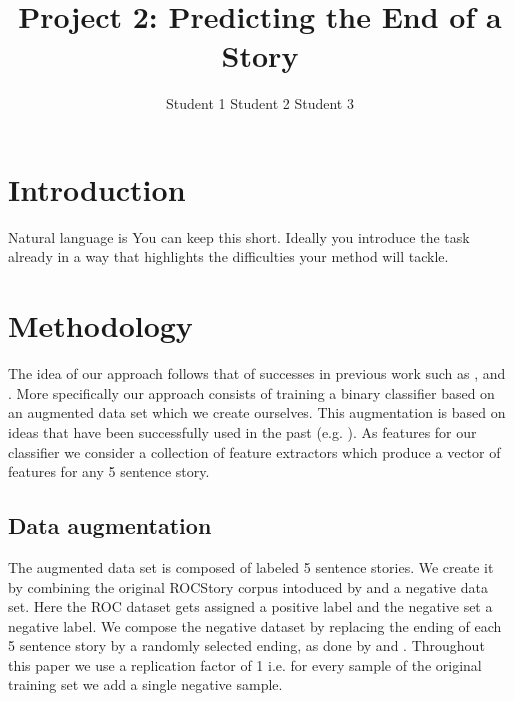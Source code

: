 \documentclass{article}
\title{Project 2: Predicting the End of a Story}
\author{Student 1 \qquad Student 2 \qquad Student 3}
\begin{document}

\maketitle



\section{Introduction}
\label{sec:intro}

Natural language is
You can keep this short. Ideally you introduce the task already in a way that highlights the difficulties  your method will tackle.

\section{Methodology}
\label{sec:general}
The idea of our approach follows that of successes in previous work such as \cite{UWNLP}, \cite{Goel} and \cite{COGCOMP}. More specifically our approach consists of training a binary classifier based on an augmented data set which we create ourselves. This augmentation is based on ideas that have been successfully used in the past (e.g. \cite{LSTMClassifier}\cite{SENTENCE_EMB}). As features for our classifier we consider a collection of feature extractors which produce a vector of features for any 5 sentence story.

\subsection{Data augmentation}
\label{sec:augmentation}
The augmented data set is composed of labeled 5 sentence stories. We create it by combining the original ROCStory corpus intoduced by \cite{ROCstories} and a negative data set. Here the ROC dataset gets assigned a positive label and the negative set a negative label. We compose the negative dataset by replacing the ending of each 5 sentence story by a randomly selected ending, as done by \cite{LSTMClassifier} and \cite{SENTENCE_EMB}. Throughout this paper we use a replication factor of 1 i.e. for every sample of the original training set we add a single negative sample.
\end{document}

